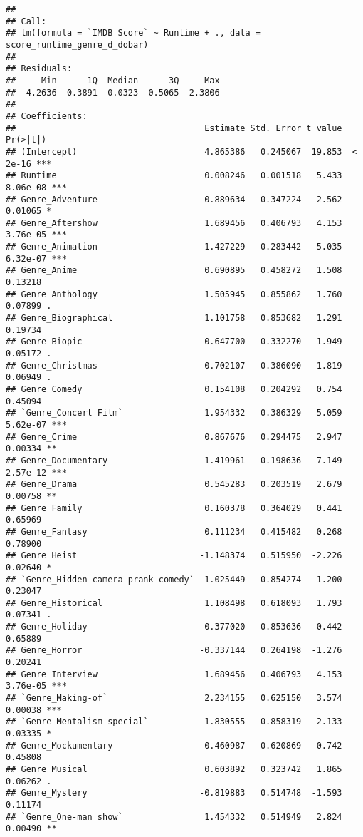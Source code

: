 \documentclass[
]{article}
\begin{document}
\begin{verbatim}
## 
## Call:
## lm(formula = `IMDB Score` ~ Runtime + ., data = score_runtime_genre_d_dobar)
## 
## Residuals:
##     Min      1Q  Median      3Q     Max 
## -4.2636 -0.3891  0.0323  0.5065  2.3806 
## 
## Coefficients:
##                                     Estimate Std. Error t value Pr(>|t|)    
## (Intercept)                         4.865386   0.245067  19.853  < 2e-16 ***
## Runtime                             0.008246   0.001518   5.433 8.06e-08 ***
## Genre_Adventure                     0.889634   0.347224   2.562  0.01065 *  
## Genre_Aftershow                     1.689456   0.406793   4.153 3.76e-05 ***
## Genre_Animation                     1.427229   0.283442   5.035 6.32e-07 ***
## Genre_Anime                         0.690895   0.458272   1.508  0.13218    
## Genre_Anthology                     1.505945   0.855862   1.760  0.07899 .  
## Genre_Biographical                  1.101758   0.853682   1.291  0.19734    
## Genre_Biopic                        0.647700   0.332270   1.949  0.05172 .  
## Genre_Christmas                     0.702107   0.386090   1.819  0.06949 .  
## Genre_Comedy                        0.154108   0.204292   0.754  0.45094    
## `Genre_Concert Film`                1.954332   0.386329   5.059 5.62e-07 ***
## Genre_Crime                         0.867676   0.294475   2.947  0.00334 ** 
## Genre_Documentary                   1.419961   0.198636   7.149 2.57e-12 ***
## Genre_Drama                         0.545283   0.203519   2.679  0.00758 ** 
## Genre_Family                        0.160378   0.364029   0.441  0.65969    
## Genre_Fantasy                       0.111234   0.415482   0.268  0.78900    
## Genre_Heist                        -1.148374   0.515950  -2.226  0.02640 *  
## `Genre_Hidden-camera prank comedy`  1.025449   0.854274   1.200  0.23047    
## Genre_Historical                    1.108498   0.618093   1.793  0.07341 .  
## Genre_Holiday                       0.377020   0.853636   0.442  0.65889    
## Genre_Horror                       -0.337144   0.264198  -1.276  0.20241    
## Genre_Interview                     1.689456   0.406793   4.153 3.76e-05 ***
## `Genre_Making-of`                   2.234155   0.625150   3.574  0.00038 ***
## `Genre_Mentalism special`           1.830555   0.858319   2.133  0.03335 *  
## Genre_Mockumentary                  0.460987   0.620869   0.742  0.45808    
## Genre_Musical                       0.603892   0.323742   1.865  0.06262 .  
## Genre_Mystery                      -0.819883   0.514748  -1.593  0.11174    
## `Genre_One-man show`                1.454332   0.514949   2.824  0.00490 ** 

\end{verbatim}
\end{document}
